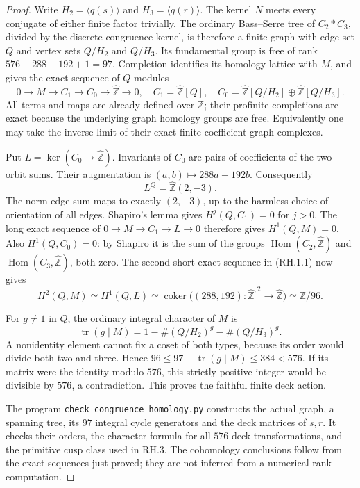 \begin{proof}
Write $H_2=\langle q(s)\rangle$ and $H_3=\langle q(r)\rangle$.
The kernel $N$ meets every conjugate of either finite factor
trivially.  The ordinary Bass--Serre tree of $C_2*C_3$, divided
by the discrete congruence kernel, is therefore a finite graph
with edge set $Q$ and vertex sets $Q/H_2$ and $Q/H_3$.
Its fundamental group is free of rank
$576-288-192+1=97$.  Completion identifies its homology lattice
with $M$, and gives the exact sequence of $Q$-modules
\[
 0\longrightarrow M\longrightarrow C_1\longrightarrow C_0
       \longrightarrow\widehat{\mathbb Z}\longrightarrow0,
 \quad
 C_1=\widehat{\mathbb Z}[Q],\quad
 C_0=\widehat{\mathbb Z}[Q/H_2]\oplus
                \widehat{\mathbb Z}[Q/H_3].
 \tag{RH.1.1}
\]
All terms and maps are already defined over $\mathbb Z$; their
profinite completions are exact because the underlying graph
homology groups are free.  Equivalently one may take the inverse
limit of their exact finite-coefficient graph complexes.

Put $L=\ker(C_0\to\widehat{\mathbb Z})$.  Invariants of $C_0$
are pairs of coefficients of the two orbit sums. Their
augmentation is $(a,b)\mapsto288a+192b$. Consequently
\[
 L^Q=\widehat{\mathbb Z}(2,-3).
\]
The norm edge sum maps to exactly $(2,-3)$, up to the harmless
choice of orientation of all edges.  Shapiro's lemma gives
$H^j(Q,C_1)=0$ for $j>0$.  The long exact sequence of
$0\to M\to C_1\to L\to0$ therefore gives $H^1(Q,M)=0$.
Also $H^1(Q,C_0)=0$: by Shapiro it is the sum of the groups
$\operatorname{Hom}(C_2,\widehat{\mathbb Z})$ and
$\operatorname{Hom}(C_3,\widehat{\mathbb Z})$, both zero.
The second short exact sequence in (RH.1.1) now gives
\[
 H^2(Q,M)\simeq H^1(Q,L)
  \simeq\operatorname{coker}
   \bigl((288,192):\widehat{\mathbb Z}^{,2}
                     \to\widehat{\mathbb Z}\bigr)
  \simeq\mathbb Z/96.
\]

For $g\ne1$ in $Q$, the ordinary integral character of $M$ is
\[
 \operatorname{tr}(g\mid M)
       =1-\#(Q/H_2)^g-\#(Q/H_3)^g.
 \tag{RH.1.2}
\]
A nonidentity element cannot fix a coset of both types, because
its order would divide both two and three. Hence
$96\leq97-\operatorname{tr}(g\mid M)\leq384<576$.
If its matrix were the identity modulo $576$, this strictly
positive integer would be divisible by $576$, a contradiction.
This proves the faithful finite deck action.

The program \texttt{check\_congruence\_homology.py} constructs
the actual graph, a spanning tree, its $97$ integral cycle
generators and the deck matrices of $s,r$.  It checks their
orders, the character formula for all $576$ deck transformations,
and the primitive cusp class used in RH.3.  The cohomology
conclusions follow from the exact sequences just proved; they
are not inferred from a numerical rank computation.
\end{proof}

